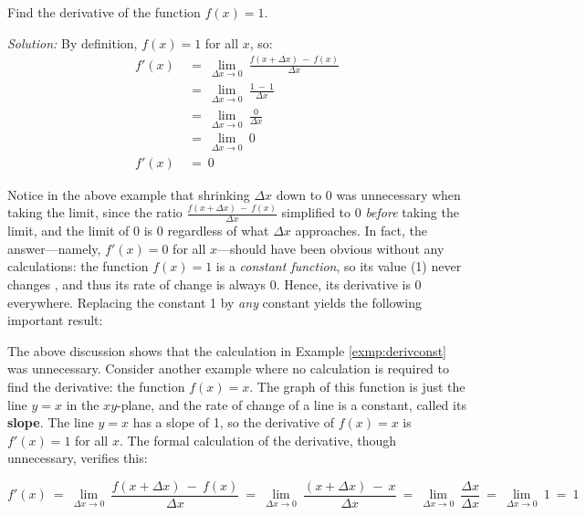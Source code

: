 \begin{exmp}\label{exmp:derivconst}
 Find the derivative of the function $f(x) = 1$.\vspace{1mm}
 \par\noindent\emph{Solution:} By definition, $f(x) = 1$ for all $x$, so:
 \begin{align*}
  f'(x) ~&=~ \lim_{\Delta x \to 0} ~\frac{f(x+\Delta x) ~-~ f(x)}
   {\Delta x}\\[6pt]
  &=~ \lim_{\Delta x \to 0} ~\frac{1 ~-~ 1}{\Delta x}\\[6pt]
  &=~ \lim_{\Delta x \to 0} ~\frac{0}{\Delta x}\\[6pt]
  &=~ \lim_{\Delta x \to 0} ~0\\[4pt]
  f'(x) ~&=~ 0
 \end{align*}
\end{exmp}
\divider
\newpage
Notice in the above example that shrinking $\Delta x$ down to $0$ was unnecessary when
taking the limit, since the ratio $\frac{f(x + \Delta x) ~-~ f(x)}{\Delta x}$
simplified to 0 \emph{before} taking the limit, and the limit of 0 is 0
regardless of what $\Delta x$ approaches. In fact, the answer---namely,
$f'(x) = 0$ for all $x$---should have been obvious
without any calculations: the function $f(x) = 1$ is a
\emph{constant function}, so
its value (1) never changes , and thus its rate of change
is always 0. Hence, its derivative is 0 everywhere. Replacing the
constant 1 by \emph{any} constant yields the following important result:

The above discussion shows that the calculation in Example
\ref{exmp:derivconst} was unnecessary. Consider another example where no
calculation is required to find the derivative: the function $f(x) = x$. The
graph of this function is just the line $y = x$ in the $xy$-plane, and
the rate of change of a line is a constant, called its
\textbf{slope}. The line $y = x$ has a slope of 1, so the derivative
of $f(x) = x$ is $f'(x) = 1$ for all $x$. The formal calculation of the
derivative, though unnecessary, verifies this:

\begin{displaymath}
 f'(x) ~=~ \lim_{\Delta x \to 0} ~\frac{f(x+\Delta x) ~-~ f(x)}{\Delta x} ~=~
  \lim_{\Delta x \to 0} ~\frac{(x + \Delta x) ~-~ x}{\Delta x} ~=~
  \lim_{\Delta x \to 0} ~\frac{\Delta x}{\Delta x} ~=~
  \lim_{\Delta x \to 0} ~1 ~=~ 1
\end{displaymath}

